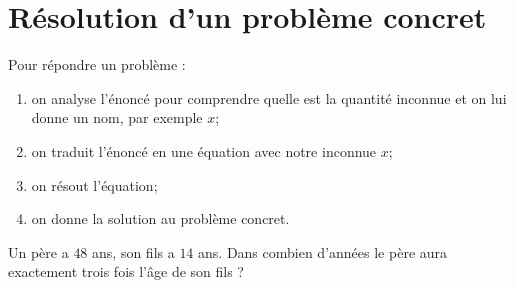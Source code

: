 \documentclass[11pt]{article}
\begin{document}
\vspace{-.3cm}
\section{Résolution d'un problème concret}
\vspace{-.3cm}
\begin{methode}
  Pour répondre un problème :
  \begin{enumerate}
    \item on analyse l'énoncé pour comprendre quelle est la quantité inconnue et
      on lui donne un nom, par exemple $x$;
    \item on traduit l'énoncé en une équation avec notre inconnue $x$;
    \item on résout l'équation;
    \item on donne la solution au problème concret.
  \end{enumerate}
\end{methode}

\begin{app}
  Un père a $48$ ans, son fils a $14$ ans. Dans combien d'années le père aura
  exactement trois fois l'âge de son fils ?
\end{app}
\end{document}
